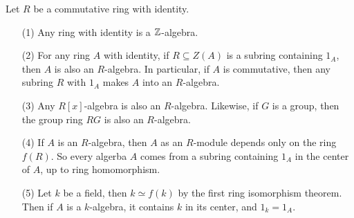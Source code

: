 
\begin{example}\label{example_4.2}
  Let $R$ be a commutative ring with identity.
  \begin{enumerate}
    \item[(1)] Any ring with identity is a $\mathbb{Z}$-algebra.

    \item[(2)] For any ring $A$ with identity, if  $R \subseteq Z(A)$
      is a subring containing $1_A$, then  $A$ is also an $R$-algebra.
      In particular, if $A$ is commutative, then any subring  $R$ with
       $1_A$ makes  $A$ into an  $R$-algebra.

     \item[(3)] Any $R[x]$-algebra is also an $R$-algebra. Likewise,
       if  $G$ is a group, then the group ring $RG$ is also an
       $R$-algebra.

     \item[(4)] If $A$ is an $R$-algebra, then $A$ as an  $R$-module
       depends only on the ring  $f(R)$. So every algerba $A$ comes
       from a subring containing $1_A$ in the center of $A$, up to
       ring homomorphism.

     \item[(5)] Let $k$ be a field, then  $k \simeq f(k)$ by the
       first ring isomorphism theorem. Then if $A$ is a  $k$-algebra,
       it contains  $k$ in its center, and  $1_k=1_A$.
  \end{enumerate}
\end{example}
